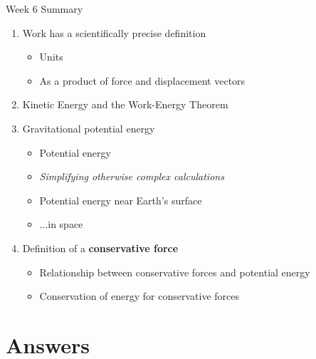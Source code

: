 \documentclass{beamer}
\begin{document}
\begin{frame}{Week 6 Summary}
\begin{enumerate}
\item \alert{Work} has a scientifically precise definition
\begin{itemize}
\item Units
\item As a product of force and displacement vectors
\end{itemize}
\item Kinetic Energy and the \alert{Work-Energy Theorem}
\item Gravitational potential energy
\begin{itemize}
\item Potential energy
\item \textit{Simplifying otherwise complex calculations}
\item Potential energy near Earth's surface
\item ...in space
\end{itemize}
\item Definition of a \textbf{conservative force}
\begin{itemize}
\item Relationship between conservative forces and potential energy
\item Conservation of energy for conservative forces
\end{itemize}
\end{enumerate}
\end{frame}

\section{Answers}
\end{document}
